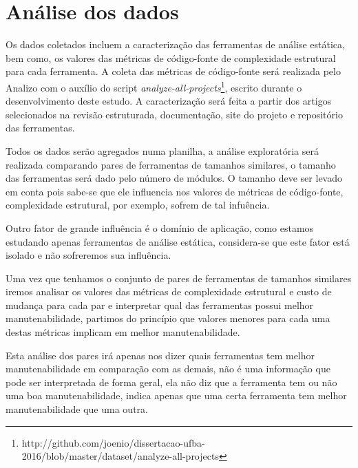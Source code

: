 %
%
%
%
%


\section{Análise dos dados} \label{analise}

Os dados coletados incluem a caracterização das ferramentas de análise
estática, bem como, os valores das métricas de código-fonte de complexidade
estrutural para cada ferramenta. A coleta das métricas de
código-fonte será realizada pelo Analizo com o auxílio do script {\em
analyze-all-projects}\footnote{http://github.com/joenio/dissertacao-ufba-2016/blob/master/dataset/analyze-all-projects},
escrito durante o desenvolvimento deste estudo. A caracterização será feita a
partir dos artigos selecionados na revisão estruturada, documentação, site do
projeto e repositório das ferramentas.

Todos os dados serão agregados numa planilha, a análise exploratória será
realizada comparando pares de ferramentas de tamanhos similares, o tamanho das
ferramentas será dado pelo número de módulos. O tamanho deve ser
levado em conta pois sabe-se que ele influencia nos valores de métricas de
código-fonte, complexidade estrutural, por exemplo, sofrem
de tal infuência.

Outro fator de grande influência é o domínio de aplicação, como estamos
estudando apenas ferramentas de análise estática, considera-se que este fator
está isolado e não sofreremos sua influência.

Uma vez que tenhamos o conjunto de pares de ferramentas de tamanhos similares
iremos analisar os valores das métricas de complexidade estrutural e custo de
mudança para cada par e interpretar qual das ferramentas possui melhor
manutenabilidade, partimos do princípio que valores menores para cada uma
destas métricas implicam em melhor manutenabilidade.

Esta análise dos pares irá apenas nos dizer quais ferramentas tem melhor
manutenabilidade em comparação com as demais, não é uma informação que
pode ser interpretada de forma geral, ela não diz que a ferramenta tem
ou não uma boa manutenabilidade, indica apenas que uma certa ferramenta
tem melhor manutenabilidade que uma outra.

